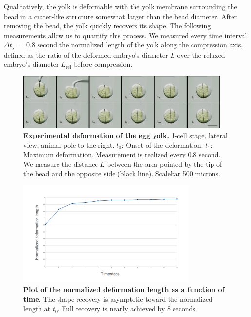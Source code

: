 Qualitatively, the yolk is deformable with the yolk membrane surrounding the bead in a crater-like structure somewhat larger than the bead diameter. After removing the bead, the yolk quickly recovers its shape. The following measurements allow us to quantify this process. We measured every time interval $\Delta\!t_{\mathrm{y}} =$ 0.8 second the normalized length of the yolk along the compression axis, defined as the ratio of the deformed embryo's diameter $L$ over the relaxed embryo's diameter $L_{\mathrm{rel}}$ before compression.
\begin{figure}
\begin{center}
\includegraphics[width=0.95\textwidth]{../../images/Cases_Studies/Case_0_Yolk/121120/121120_raw_embryo1_m.png}
\end{center}
\caption{\textbf{Experimental deformation of the egg yolk.} 1-cell stage, lateral view, animal pole to the right. $t_0$: Onset of the deformation. $t_1$: Maximum deformation. Measurement is realized every 0.8 second. We measure the distance $L$ between the area pointed by the tip of the bead and the opposite side (black line). Scalebar 500 microns. }
\label{121120_121120_raw_embryo1_m}
\end{figure}
\begin{figure}
\begin{center}
\includegraphics[width=0.8\textwidth]{../../images/Cases_Studies/Case_0_Yolk/plot_normalized_def.png}
\end{center}
\caption{\textbf{Plot of the normalized deformation length as a function of time.} The shape recovery is asymptotic toward the normalized length at $t_0$. Full recovery is nearly achieved by 8 seconds.}
\label{Case_0_Yolk_plot_normalized}
\end{figure}

